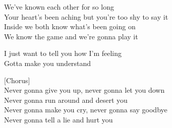 We've known each other for so long\\
Your heart's been aching but you're too shy to say it\\
Inside we both know what's been going on\\
We know the game and we're gonna play it\par
\vspace{10pt}
I just want to tell you how I'm feeling\\
Gotta make you understand\par
\vspace{10pt}
{[}Chorus{]}\\
Never gonna give you up, never gonna let you down\\
Never gonna run around and desert you\\
Never gonna make you cry, never gonna say goodbye\\
Never gonna tell a lie and hurt you
